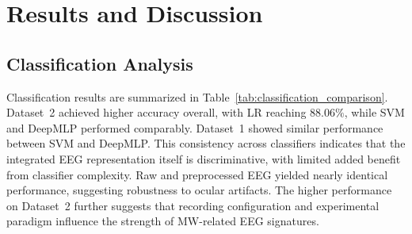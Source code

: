 \documentclass[conference]{IEEEtran}
\begin{document}
\section{Results and Discussion}
\subsection{Classification Analysis}
Classification results are summarized in Table~\ref{tab:classification_comparison}. Dataset~2 achieved higher accuracy overall, with LR reaching $88.06\%$, while SVM and DeepMLP performed comparably. Dataset~1 showed similar performance between SVM and DeepMLP. This consistency across classifiers indicates that the integrated EEG representation itself is discriminative, with limited added benefit from classifier complexity. Raw and preprocessed EEG yielded nearly identical performance, suggesting robustness to ocular artifacts. The higher performance on Dataset~2 further suggests that recording configuration and experimental paradigm influence the strength of MW-related EEG signatures.
\begin{table}[h]
\centering
\caption{Classification performance on Dataset~1 and Dataset~2.}
\label{tab:classification_comparison}
\end{table}
\end{document}
